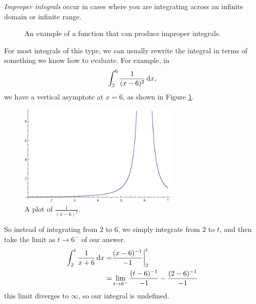 \begin{defn}
\emph{Improper integrals} occur in cases where you are integrating across an infinite domain or infinite range.
\end{defn}
\begin{figure}[H]
  \begin{center}
  \end{center}
  \caption{An example of a function that can produce improper integrals.}
\end{figure}
For most integrals of this type, we can usually rewrite the integral in terms of something we know how to evaluate.
For example, in
\begin{equation}
  \int^{6}_{2} \frac{1}{(x-6)^2} \,\mathrm{d} x,
  \label{eq:improper01}
\end{equation}
we have a vertical asymptote at $x=6$, as shown in Figure \ref{fig:improper01}.
\begin{figure}[H]
  \begin{center}
    \includegraphics[width=3in]{continuous/integration/improper_01}
  \end{center}
  \caption{A plot of $\frac{1}{(x-6)^2}$.}
  \label{fig:improper01}
\end{figure}
So instead of integrating from $2$ to $6$, we simply integrate from $2$ to $t$, and then take the limit as $t\to6^-$ of our answer.
\begin{align*}
  \int^{t}_2 \frac{1}{x+6} \,\mathrm{d} x
  =& \frac{(x-6)^{-1}}{-1} \bigg|^t_2 \\
  =& \lim_{t \to 6^-} \frac{(t-6)^{-1}}{-1}-\frac{(2-6)^{-1}}{-1}
\end{align*}
this limit diverges to $\infty$, so our integral is undefined.

